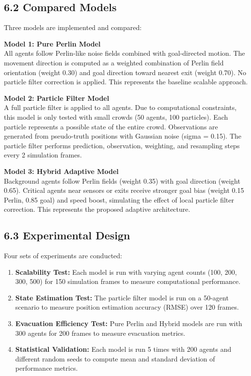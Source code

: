 \documentclass[
  11pt,
]{article}
\begin{document}
\subsection{6.2 Compared Models}\label{compared-models}

Three models are implemented and compared:

\textbf{Model 1: Pure Perlin Model}\\
All agents follow Perlin-like noise fields combined with goal-directed
motion. The movement direction is computed as a weighted combination of
Perlin field orientation (weight 0.30) and goal direction toward nearest
exit (weight 0.70). No particle filter correction is applied. This
represents the baseline scalable approach.

\textbf{Model 2: Particle Filter Model}\\
A full particle filter is applied to all agents. Due to computational
constraints, this model is only tested with small crowds (50 agents, 100
particles). Each particle represents a possible state of the entire
crowd. Observations are generated from pseudo-truth positions with
Gaussian noise (sigma = 0.15). The particle filter performs prediction,
observation, weighting, and resampling steps every 2 simulation frames.

\textbf{Model 3: Hybrid Adaptive Model}\\
Background agents follow Perlin fields (weight 0.35) with goal direction
(weight 0.65). Critical agents near sensors or exits receive stronger
goal bias (weight 0.15 Perlin, 0.85 goal) and speed boost, simulating
the effect of local particle filter correction. This represents the
proposed adaptive architecture.

\subsection{6.3 Experimental Design}\label{experimental-design}

Four sets of experiments are conducted:

\begin{enumerate}
\def\labelenumi{\arabic{enumi}.}
\item
  \textbf{Scalability Test:} Each model is run with varying agent counts
  (100, 200, 300, 500) for 150 simulation frames to measure
  computational performance.
\item
  \textbf{State Estimation Test:} The particle filter model is run on a
  50-agent scenario to measure position estimation accuracy (RMSE) over
  120 frames.
\item
  \textbf{Evacuation Efficiency Test:} Pure Perlin and Hybrid models are
  run with 300 agents for 200 frames to measure evacuation metrics.
\item
  \textbf{Statistical Validation:} Each model is run 5 times with 200
  agents and different random seeds to compute mean and standard
  deviation of performance metrics.
\end{enumerate}
\end{document}
